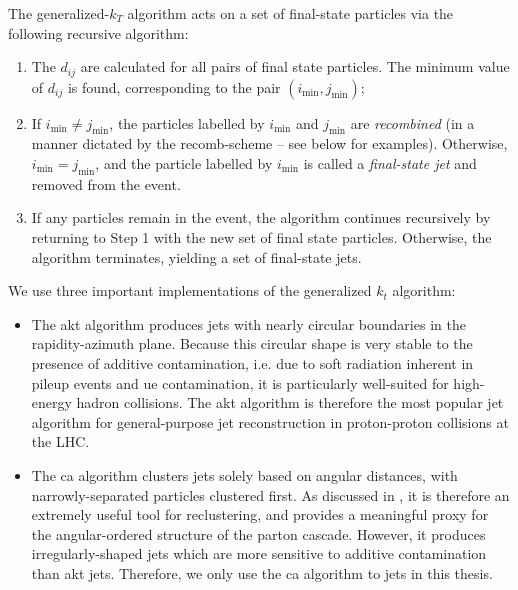 \begin{subappendices}
\begin{definitionbox}
    The generalized-\(k_T\) algorithm acts on a set of final-state particles via the following recursive algorithm:
    \begin{enumerate}
        \item
            The \(d_{ij}\) are calculated for all pairs of final state particles.
            The minimum value of \(d_{ij}\) is found, corresponding to the pair \((i_\text{min}, j_\text{min})\);

        \item
            If \(i_\text{min} \neq j_\text{min}\), the particles labelled by \(i_\text{min}\) and \(j_\text{min}\) are \textit{recombined} (in a manner dictated by the \gls{recomb-scheme} -- see below for examples).
            Otherwise, \(i_\text{min} = j_\text{min}\), and the particle labelled by \(i_\text{min}\) is called a \textit{final-state \gls{jet}} and removed from the event.

        \item
            If any particles remain in the event, the algorithm continues recursively by returning to Step 1 with the new set of final state particles.
            Otherwise, the algorithm terminates, yielding a set of final-state jets.
    \end{enumerate}
\end{definitionbox}

We use three important implementations of the generalized \(k_t\) algorithm:
\begin{itemize}
    \item
         \cite{Cacciari:2008gp}

        The \gls{akt} algorithm produces jets with nearly circular boundaries in the rapidity-azimuth plane.
        Because this circular shape is very stable to the presence of additive contamination, i.e. due to soft radiation inherent in \gls{pileup} events and \gls{ue} contamination, it is particularly well-suited for high-energy hadron collisions.
        The \gls{akt} algorithm is therefore the most popular jet algorithm for general-purpose jet reconstruction in proton-proton collisions at the LHC.

    \item
         \cite{Dokshitzer:1997in,Wobisch:1998wt}

        The \gls{ca} algorithm clusters jets solely based on angular distances, with narrowly-separated particles clustered first.
        As discussed in , it is therefore an extremely useful tool for \gls{reclustering}, and provides a meaningful proxy for the angular-ordered structure of the parton cascade.
        However, it produces irregularly-shaped jets which are more sensitive to additive contamination than \gls{akt} jets.
        Therefore, we only use the \gls{ca} algorithm to  jets in this thesis.



\end{itemize}
\end{subappendices}
